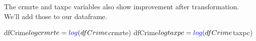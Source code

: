\documentclass[]{article}
\newenvironment{Shaded}{}{}
\newcommand{\KeywordTok}[1]{\textcolor[rgb]{0.00,0.00,1.00}{#1}}
\newcommand{\NormalTok}[1]{#1}
\newcommand{\OperatorTok}[1]{#1}
\newcommand{\StringTok}[1]{\textcolor[rgb]{0.00,0.50,0.50}{#1}}
\begin{document}
The crmrte and taxpc variables also show improvement after
transformation. We'll add those to our dataframe.

\begin{Shaded}
\begin{Highlighting}[]
\NormalTok{dfCrime}\OperatorTok{$}\NormalTok{logcrmrte =}\StringTok{ }\KeywordTok{log}\NormalTok{(dfCrime}\OperatorTok{$}\NormalTok{crmrte)}
\NormalTok{dfCrime}\OperatorTok{$}\NormalTok{logtaxpc =}\StringTok{ }\KeywordTok{log}\NormalTok{(dfCrime}\OperatorTok{$}\NormalTok{taxpc)}
\end{Highlighting}
\end{Shaded}
\end{document}
